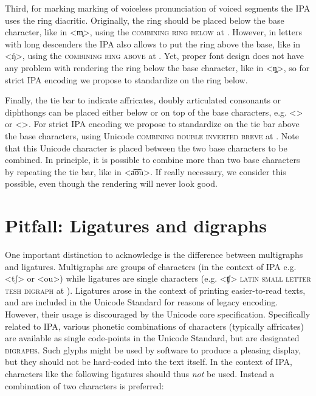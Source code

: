 Third, for marking marking of voiceless pronunciation of voiced segments the IPA
uses the ring diacritic. Originally, the ring should be placed below the 
base character, like in <m̥>, using the \textsc{combining ring below} at . 
However, in letters with long descenders the IPA also allows to put the ring 
above the base, like in <ŋ̊>, using the \textsc{combining ring above} at 
. Yet, proper font design does not have any problem with rendering 
the ring below the base character, like in <ŋ̥>, so for strict IPA encoding we 
propose to standardize on the ring below.
 
Finally, the tie bar to indicate affricates, doubly articulated consonants or
diphthongs can be placed either below or on top of the base characters, e.g.
<> or <>. For strict IPA encoding we propose to standardize on the tie bar
above the base characters, using Unicode \textsc{combining double inverted
breve} at . Note that this Unicode character is placed between the two 
base characters to be combined. In principle, it is possible to combine more 
than two base characters by repeating the tie bar, like in <a͡o͡u>. If really
necessary, we consider this possible, even though the rendering will never look 
good.

\section{Pitfall: Ligatures and digraphs}
\label{pitfall-ligatures-digraphs}     

One important distinction to acknowledge is the difference between multigraphs
and ligatures. Multigraphs are groups of characters (in the context of IPA e.g.
<tʃ> or <ou>) while ligatures are single characters (e.g. <ʧ> \textsc{latin
small letter tesh digraph} at ). Ligatures arose in the context of
printing easier-to-read texts, and are included in the Unicode Standard for
reasons of legacy encoding. However, their usage is discouraged by the Unicode
core specification. Specifically related to IPA, various phonetic combinations
of characters (typically affricates) are available as single code-points in the
Unicode Standard, but are designated \textsc{digraphs}. Such glyphs might be used by
software to produce a pleasing display, but they should not be hard-coded into
the text itself. In the context of IPA, characters like the following ligatures
should thus \emph{not} be used. Instead a combination of two characters is
preferred:
      

